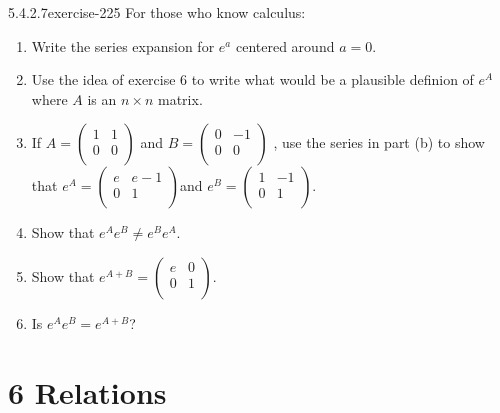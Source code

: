 \documentclass[twoside,10pt,]{book}
\numberwithin{equation}{section}
\begin{document}
\begin{divisionsolution}{5.4.2.7}{}{exercise-225}%
\hypertarget{p-1925}{}%
For those who know calculus:%
\par
\hypertarget{p-1926}{}%
\leavevmode%
\begin{enumerate}[label=(\alph*)]
\item\hypertarget{li-1033}{}\hypertarget{p-1927}{}%
Write the series expansion for \(e^a\) centered around \(a=0\).%
\item\hypertarget{li-1034}{}\hypertarget{p-1928}{}%
Use the idea of exercise 6 to write what would be a plausible definion of \(e^A\) where \(A\) is an \(n \times  n\) matrix.%
\item\hypertarget{li-1035}{}\hypertarget{p-1929}{}%
If \(A=\left(
\begin{array}{cc}
1 & 1 \\
0 & 0 \\
\end{array}
\right)\) and \(B =\left(
\begin{array}{cc}
0 & -1 \\
0 & 0 \\
\end{array}
\right)\) , use the series in part (b) to show that \(e^A= \left(
\begin{array}{cc}
e & e-1 \\
0 & 1 \\
\end{array}
\right)\)and \(e^B= \left(
\begin{array}{cc}
1 & -1 \\
0 & 1 \\
\end{array}
\right)\).%
\item\hypertarget{li-1036}{}\hypertarget{p-1930}{}%
Show that \(e^Ae^B\neq e^Be^A\).%
\item\hypertarget{li-1037}{}\hypertarget{p-1931}{}%
Show that  \(e^{A+B}= \left(
\begin{array}{cc}
e & 0 \\
0 & 1 \\
\end{array}
\right)\).%
\item\hypertarget{li-1038}{}\hypertarget{p-1932}{}%
Is \(e^Ae^B=e^{A+B}\)?%
\end{enumerate}
%
\end{divisionsolution}%
\chapter*{6 Relations}
\end{document}

